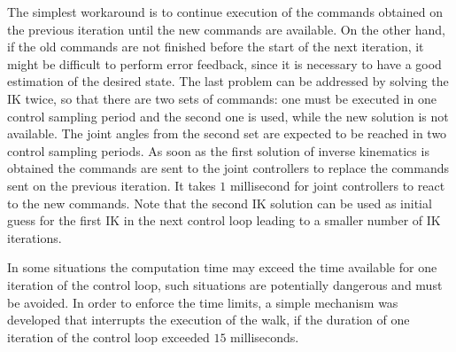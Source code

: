 The simplest workaround is to continue execution of the commands obtained on the 
previous iteration until the new commands are available. On the other hand, if the 
old commands are not finished before the start of the next iteration, it might be
difficult to perform error feedback, since it is necessary to have a good estimation
of the desired state. The last problem can be addressed by solving the \ac{IK} twice,
so that there are two sets of commands: one must be executed in one control sampling
period and the second one is used, while the new solution is not available. The joint 
angles from the second set are expected to be reached in two control sampling periods. 
As soon as the first solution of inverse kinematics is obtained the commands are sent
to the joint controllers to replace the commands sent on the previous iteration. It
takes $1$ millisecond for joint controllers to react to the new commands. Note that 
the second \ac{IK} solution can be used as initial guess for the first \ac{IK} in the 
next control loop leading to a smaller number of \ac{IK} iterations.

In some situations the computation time may exceed the time available for one
iteration of the control loop, such situations are potentially dangerous and
must be avoided. In order to enforce the time limits, a simple mechanism was 
developed that interrupts the execution of the walk, if the duration of one 
iteration of the control loop exceeded $15$ milliseconds.
